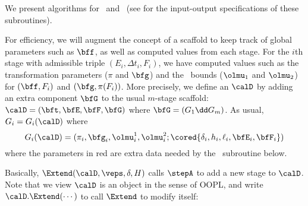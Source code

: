 
	We present algorithms for
	\Extend\ and \Refine\
	(see  for the input-output
	specifications of these subroutines).

	For efficiency, we will augment the concept of a scaffold
	to keep track of global parameters such as $\bff$, as well as
	computed values from each stage.
	For the $i$th stage with admissible triple
	$(E_i,\Delta t_i, F_i)$, we have computed values such as
	the transformation parameters ($\pi$ and $\bfg$)
	and the \lognorm\ bounds ($\olmu_1$ and $\olmu_2$) for
	$(\bff,F_i)$ and $(\bfg,\pi(F_i))$.
	More precisely, we define an 
	$\calD$ by adding an extra component $\bfG$ to the
	usual $m$-stage scaffold:
			$\calD = (\bft, \bfE, \bfF, \bfG)$
	where $\bfG=(G_1\dd G_m)$. 
	As usual, $G_i = G_i(\calD)$ where
		$$G_i(\calD) =(\pi_i,\bfg_i,\olmu^1_i,\olmu^2_i;
					\cored{\delta_i, h_i, \ell_i, \bfE_i, \bfF_i})$$
	where the parameters in red are
	extra data needed by the \Refine\ subroutine below.

	Basically, 
	$\Extend(\calD, \veps,\delta,H)$
		calls $\stepA$ to add a new stage to $\calD$.
		Note that we view $\calD$ is an object in the sense
		of OOPL, and write $\calD.\Extend(\cdots)$ to call
		$\Extend$ to modify itself: 

	{\scriptsize
	\Ldent{}}

